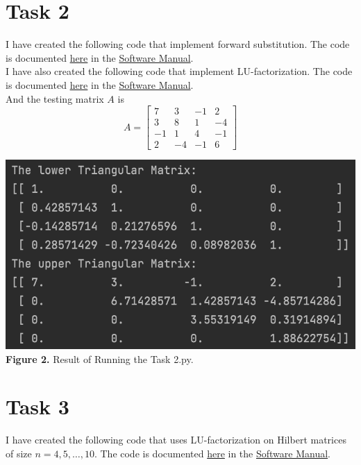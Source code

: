 \documentclass{article}
\begin{document}
\section*{Task 2}
I have created the following code that implement forward substitution. The code is documented \href{https://github.com/GoByMark/math4610/blob/main/Homework_Tasks/Tasksheet_08/src/forSub.py}{here} in the \href{https://github.com/GoByMark/math4610/blob/main/Homework_Tasks/Software_Manual/Software_Manual_toc.md}{Software Manual}.\\

I have also created the following code that implement LU-factorization. The code is documented \href{https://github.com/GoByMark/math4610/blob/main/Homework_Tasks/Tasksheet_08/src/Task_2.py}{here} in the \href{https://github.com/GoByMark/math4610/blob/main/Homework_Tasks/Software_Manual/Software_Manual_toc.md}{Software Manual}.\\
And the testing matrix $A$ is 
$$A = \begin{bmatrix}
7 & 3 & -1 & 2\\
3 & 8 &  1 & -4\\
-1 & 1 & 4 & -1\\
2 & -4 & -1 & 6
\end{bmatrix}$$

\begin{center}
\includegraphics[width=\textwidth]{Screenshots/2.png}\\
{\bf Figure 2.} Result of Running the Task 2.py.
\end{center}

\section*{Task 3}
I have created the following code that uses LU-factorization on Hilbert matrices of size $n = 4, 5, \dots, 10$. The code is documented \href{https://github.com/GoByMark/math4610/blob/main/Homework_Tasks/Tasksheet_08/src/Task_3.py}{here} in the \href{https://github.com/GoByMark/math4610/blob/main/Homework_Tasks/Software_Manual/Software_Manual_toc.md}{Software Manual}.\\

\end{document}
